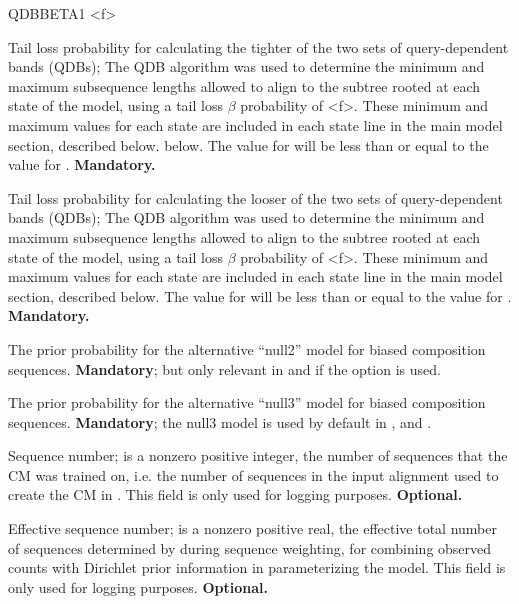 \begin{sreitems}{QDBBETA1 <f>}
\item [\emprog{QDBBETA1 <f>}] Tail loss probability for calculating
  the tighter of the two sets of query-dependent bands (QDBs); The QDB
  algorithm \cite{NawrockiEddy07} was used to determine the minimum
  and maximum subsequence lengths allowed to align to the subtree
  rooted at each state of the model, using a tail loss $\beta$
  probability of <f>. These minimum and maximum values for each state
  are included in each state line in the main model section, described
  below.  below. The  value for  will be
  less than or equal to the  value for .
  \textbf{Mandatory.}

\item [\emprog{QDBBETA2 <f>}] Tail loss probability for calculating
  the looser of the two sets of query-dependent bands (QDBs); The QDB
  algorithm \cite{NawrockiEddy07} was used to determine the minimum
  and maximum subsequence lengths allowed to align to the subtree
  rooted at each state of the model, using a tail loss $\beta$
  probability of <f>. These minimum and maximum values for each state
  are included in each state line in the main model section, described
  below. The  value for  will be less than
  or equal to the  value for .
  \textbf{Mandatory.}

\item [\emprog{N2OMEGA <f>}] The prior probability for the alternative
  ``null2'' model for biased composition
  sequences. \textbf{Mandatory}; but only relevant in  and
   if the  option is used.

\item [\emprog{N3OMEGA <f>}] The prior probability for the alternative
  ``null3'' model for biased composition
  sequences. \textbf{Mandatory}; the null3 model is used by default in 
  ,  and .

\item [\emprog{NSEQ <d>}] Sequence number;  is a nonzero
positive integer, the number of sequences that the CM was trained on,
i.e. the number of sequences in the input alignment used to create the
CM in .  This field is only used for logging
purposes.  \textbf{Optional.}

\item [\emprog{EFFN <f>}] Effective sequence number;  is a
nonzero positive real, the effective total number of sequences
determined by  during sequence weighting, for combining
observed counts with Dirichlet prior information in parameterizing the
model. This field is only used for logging purposes.
\textbf{Optional.}


\end{sreitems}
